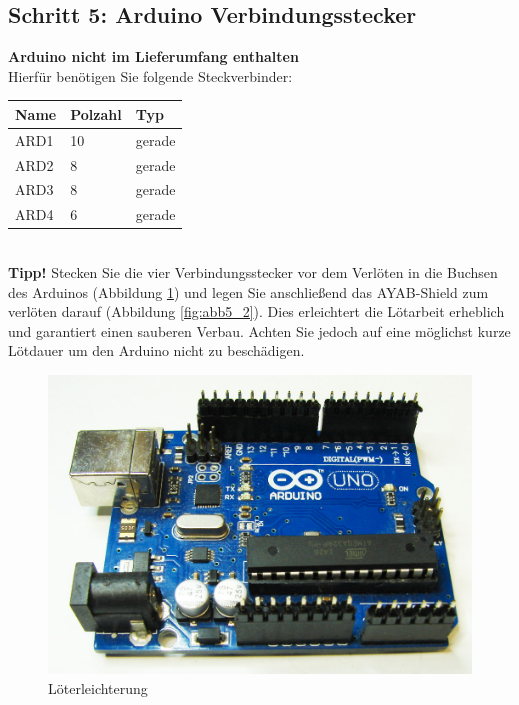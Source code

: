 \documentclass[fleqn,10pt]{SelfArx} %
\begin{document}
\FloatBarrier

 \subsection*{Schritt 5: Arduino Verbindungsstecker}

\textbf{Arduino nicht im Lieferumfang enthalten}\\

Hierfür benötigen Sie folgende Steckverbinder:\\

\begin{tabular}{lll}
\hline
\textbf{Name} & \textbf{Polzahl}  & \textbf{Typ} \\ \hline
ARD1          & 10                & gerade       \\ \hline
ARD2          & 8                 & gerade       \\ \hline
ARD3          & 8                 & gerade       \\ \hline
ARD4          & 6                 & gerade       \\ \hline
\end{tabular}\\


\textbf{Tipp!} Stecken Sie die vier Verbindungsstecker vor dem Verlöten in die Buchsen des Arduinos (Abbildung \ref{fig:abb5_1}) und legen Sie anschließend das AYAB-Shield zum verlöten darauf (Abbildung \ref{fig:abb5_2}). Dies erleichtert die Lötarbeit erheblich und garantiert einen sauberen Verbau. Achten Sie jedoch auf eine möglichst kurze Lötdauer um den Arduino nicht zu beschädigen.

\begin{figure}[tbhp]\centering
\includegraphics[width=\linewidth]{abb5_1}
\caption{Löterleichterung}
\label{fig:abb5_1}
\end{figure}
\end{document}
